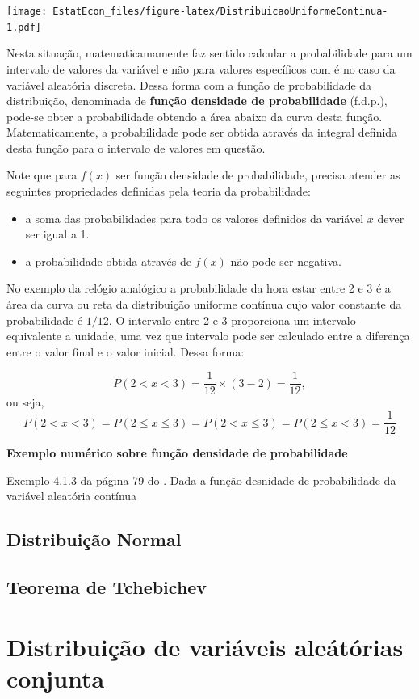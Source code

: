 \documentclass[
]{book}
\providecommand{\tightlist}{%
  \setlength{\itemsep}{0pt}\setlength{\parskip}{0pt}}
\begin{document}
\texttt{[image: EstatEcon\_files/figure-latex/DistribuicaoUniformeContinua-1.pdf]}

Nesta situação, matematicamamente faz sentido calcular a probabilidade para um intervalo de valores da variável e não para valores específicos com é no caso da variável aleatória discreta. Dessa forma com a função de probabilidade da distribuição, denominada de \textbf{função densidade de probabilidade} (f.d.p.), pode-se obter a probabilidade obtendo a área abaixo da curva desta função. Matematicamente, a probabilidade pode ser obtida através da integral definida desta função para o intervalo de valores em questão.

Note que para \(f(x)\) ser função densidade de probabilidade, precisa atender as seguintes propriedades definidas pela teoria da probabilidade:

\begin{itemize}
\tightlist
\item
  a soma das probabilidades para todo os valores definidos da variável \(x\) dever ser igual a 1.
\item
  a probabilidade obtida através de \(f(x)\) não pode ser negativa.
\end{itemize}

No exemplo da relógio analógico a probabilidade da hora estar entre 2 e 3 é a área da curva ou reta da distribuição uniforme contínua cujo valor constante da probabilidade é \(1/12\). O intervalo entre 2 e 3 proporciona um intervalo equivalente a unidade, uma vez que intervalo pode ser calculado entre a diferença entre o valor final e o valor inicial. Dessa forma:

\[
P(2 < x < 3) = \dfrac{1}{12} \times \left( 3 - 2 \right) = \dfrac{1}{12},
\]
ou seja,
\[
P(2<x<3) = P(2\leq x \leq 3) = P(2 < x \leq 3) = P(2\leq x < 3) = \dfrac{1}{12}
\]

\textbf{Exemplo numérico sobre função densidade de probabilidade}

Exemplo 4.1.3 da página 79 do \citet{Sartoris2013}. Dada a função desnidade de probabilidade da variável aleatória contínua

\hypertarget{distribuiuxe7uxe3o-normal}{%
\section{Distribuição Normal}\label{distribuiuxe7uxe3o-normal}}

\hypertarget{teorema-de-tchebichev}{%
\section{Teorema de Tchebichev}\label{teorema-de-tchebichev}}

\hypertarget{distribuiuxe7uxe3o-de-variuxe1veis-aleuxe1tuxf3rias-conjunta}{%
\chapter{Distribuição de variáveis aleátórias conjunta}\label{distribuiuxe7uxe3o-de-variuxe1veis-aleuxe1tuxf3rias-conjunta}}

  
\end{document}
